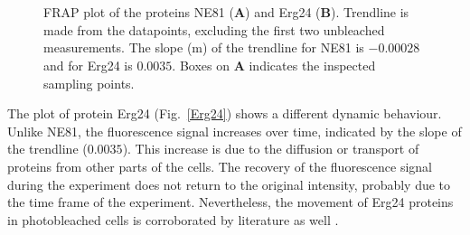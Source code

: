 \begin{figure}[h!]
\centering
{}\\
 \\
\caption[FRAPres]{FRAP plot of the proteins NE81 (\textbf{A}) and Erg24 (\textbf{B}). 
Trendline is made from the datapoints, excluding the first two unbleached measurements. 
The slope (m) of the trendline for NE81 is $-0.00028$ and for Erg24 is $0.0035$. 
Boxes on \textbf{A} indicates the inspected sampling points.} 
\label{fig:FRAPres}
\end{figure}

The plot of protein Erg24 (Fig.~\ref{Erg24}) shows a different dynamic behaviour. 
Unlike NE81, the fluorescence signal increases over time, indicated by the slope of the trendline ($0.0035$). 
This increase is due to the diffusion or transport of proteins from other parts of the cells. The recovery of the fluorescence signal during the experiment does not return to the original intensity, probably due to the time frame of the experiment. 
Nevertheless, the movement of Erg24 proteins in photobleached cells is corroborated by literature as well \cite{Batsios2019}.

